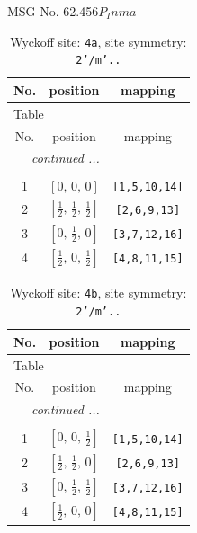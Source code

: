 \documentclass[fleqn,8pt]{jsarticle}
\begin{document}
\setcounter{MaxMatrixCols}{32}

\renewcommand{\tablename}{Table~}
\renewcommand{\figurename}{Figure~}
\begin{center}
\LARGE
MSG No. 62.456\quad$P_{I}nma$
\end{center}
\renewcommand{\arraystretch}{1.2}
\begin{longtable}{ccc}
\caption{Wyckoff site: {\tt 4a}, site symmetry: {\tt 2'/m'..}}
 \\
 \hline \hline
No. & position & mapping \\ \hline \endfirsthead

\multicolumn{2}{l}{\tablename\ \thetable{}} \\
 \hline \hline
No. & position & mapping \\ \hline \endhead

 \hline \hline
\multicolumn{2}{r}{\footnotesize\it continued ...} \\ \endfoot

 \hline \hline
\multicolumn{2}{r}{} \\ \endlastfoot

1 & $\left[ 0,\, 0,\, 0 \right]$ & {\tt [1,5,10,14]} \\ \hline
2 & $\left[ \frac{1}{2},\, \frac{1}{2},\, \frac{1}{2} \right]$ & {\tt [2,6,9,13]} \\ \hline
3 & $\left[ 0,\, \frac{1}{2},\, 0 \right]$ & {\tt [3,7,12,16]} \\ \hline
4 & $\left[ \frac{1}{2},\, 0,\, \frac{1}{2} \right]$ & {\tt [4,8,11,15]} \\
\end{longtable}
\renewcommand{\arraystretch}{1.2}
\begin{longtable}{ccc}
\caption{Wyckoff site: {\tt 4b}, site symmetry: {\tt 2'/m'..}}
 \\
 \hline \hline
No. & position & mapping \\ \hline \endfirsthead

\multicolumn{2}{l}{\tablename\ \thetable{}} \\
 \hline \hline
No. & position & mapping \\ \hline \endhead

 \hline \hline
\multicolumn{2}{r}{\footnotesize\it continued ...} \\ \endfoot

 \hline \hline
\multicolumn{2}{r}{} \\ \endlastfoot

1 & $\left[ 0,\, 0,\, \frac{1}{2} \right]$ & {\tt [1,5,10,14]} \\ \hline
2 & $\left[ \frac{1}{2},\, \frac{1}{2},\, 0 \right]$ & {\tt [2,6,9,13]} \\ \hline
3 & $\left[ 0,\, \frac{1}{2},\, \frac{1}{2} \right]$ & {\tt [3,7,12,16]} \\ \hline
4 & $\left[ \frac{1}{2},\, 0,\, 0 \right]$ & {\tt [4,8,11,15]} \\
\end{longtable}
\end{document}
